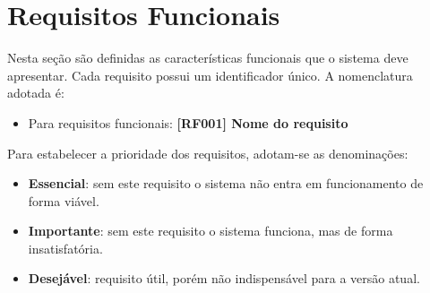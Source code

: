 \section{Requisitos Funcionais}

Nesta seção são definidas as características funcionais que o sistema deve apresentar. Cada requisito possui um identificador único. A nomenclatura adotada é:

\begin{itemize}[leftmargin=1.2cm]
    \item Para requisitos funcionais: \textbf{[RF001] Nome do requisito}
\end{itemize}

Para estabelecer a prioridade dos requisitos, adotam-se as denominações:

\begin{itemize}[leftmargin=1.2cm]
    \item \textbf{Essencial}: sem este requisito o sistema não entra em funcionamento de forma viável.
    \item \textbf{Importante}: sem este requisito o sistema funciona, mas de forma insatisfatória.
    \item \textbf{Desejável}: requisito útil, porém não indispensável para a versão atual.
\end{itemize}



\newcommand{\rfreqid}{RF\ifnum\value{rfreq}<10 00\else\ifnum\value{rfreq}<100 0\fi\fi\arabic{rfreq}}

\newcommand{\nfreqid}{NF\ifnum\value{nfreq}<10 00\else\ifnum\value{nfreq}<100 0\fi\fi\arabic{nfreq}}

\newcommand{\reqfunc}[2]{%
  \refstepcounter{rfreq}%
  \subsection{[\rfreqid] #2}%
  \label{#1}%
  \noindent\textbf{Descrição:} \textless preencher\textgreater

  \noindent\textbf{Prioridade:} \textless Essencial, Importante ou Desejável\textgreater

  \noindent\textbf{Dependência:} \textless informar requisitos relacionados, se houver\textgreater

  \noindent\textbf{Outros:} \textless atores, observações ou restrições complementares\textgreater

  \vspace{0.4cm}
}

